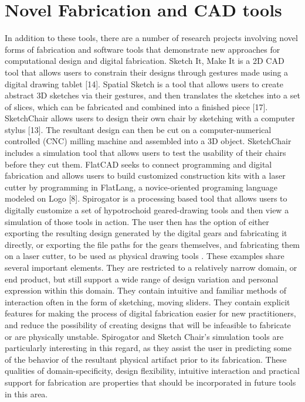 \section{Novel Fabrication and CAD tools}
In addition to these tools, there are a number of research projects involving novel forms of fabrication and software tools that demonstrate new approaches for computational design and digital fabrication. Sketch It, Make It is a 2D CAD tool that allows users to constrain their designs through gestures made using a digital drawing tablet [14]. Spatial Sketch is a tool that allows users to create abstract 3D sketches via their gestures, and then translates the sketches into a set of slices, which can be fabricated and combined into a finished piece [17].  SketchChair allows users to design their own chair by sketching with a computer stylus [13]. The resultant design can then be cut on a computer-numerical controlled (CNC) milling machine and assembled into a 3D object. SketchChair includes a simulation tool that allows users to test the usability of their chairs before they cut them. FlatCAD seeks to connect programming and digital fabrication and allows users to build customized construction kits with a laser cutter by programming in FlatLang, a novice-oriented programing language modeled on Logo [8]. Spirogator is a processing based tool that allows users to digitally customize a set of hypotrochoid geared-drawing tools and then view a simulation of those tools in action. The user then has the option of either exporting the resulting design generated by the digital gears and fabricating it directly, or exporting the file paths for the gears themselves, and fabricating them on a laser cutter, to be used as physical drawing tools \cite{spirogator}. These examples share several important elements. They are restricted to a relatively narrow domain, or end product, but still support a wide range of design variation and personal expression within this domain. They contain intuitive and familiar methods of interaction often in the form of sketching, moving sliders. They contain explicit features for making the process of digital fabrication easier for new practitioners, and reduce the possibility of creating designs that will be infeasible to fabricate or are physically unstable. Spirogator and Sketch Chair's simulation tools are particularly interesting in this regard, as they assist the user in predicting some of the behavior of the resultant physical artifact prior to its fabrication. These qualities of domain-specificity, design flexibility, intuitive interaction and  practical support for fabrication are properties that should be incorporated in future tools in this area. 
